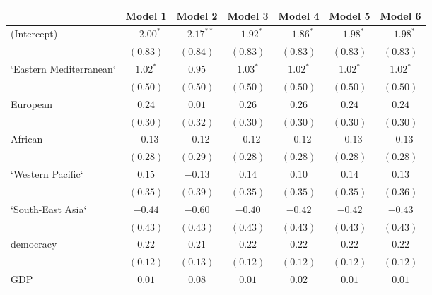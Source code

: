 
\begin{table}[!h]
\begin{center}
\begin{tabular}{l c c c c c c }
\toprule
 & Model 1 & Model 2 & Model 3 & Model 4 & Model 5 & Model 6 \\
\midrule
(Intercept)             & $-2.00^{*}$  & $-2.17^{**}$ & $-1.92^{*}$  & $-1.86^{*}$  & $-1.98^{*}$  & $-1.98^{*}$  \\
                        & $(0.83)$     & $(0.84)$     & $(0.83)$     & $(0.83)$     & $(0.83)$     & $(0.83)$     \\
`Eastern Mediterranean` & $1.02^{*}$   & $0.95$       & $1.03^{*}$   & $1.02^{*}$   & $1.02^{*}$   & $1.02^{*}$   \\
                        & $(0.50)$     & $(0.50)$     & $(0.50)$     & $(0.50)$     & $(0.50)$     & $(0.50)$     \\
European                & $0.24$       & $0.01$       & $0.26$       & $0.26$       & $0.24$       & $0.24$       \\
                        & $(0.30)$     & $(0.32)$     & $(0.30)$     & $(0.30)$     & $(0.30)$     & $(0.30)$     \\
African                 & $-0.13$      & $-0.12$      & $-0.12$      & $-0.12$      & $-0.13$      & $-0.13$      \\
                        & $(0.28)$     & $(0.29)$     & $(0.28)$     & $(0.28)$     & $(0.28)$     & $(0.28)$     \\
`Western Pacific`       & $0.15$       & $-0.13$      & $0.14$       & $0.10$       & $0.14$       & $0.13$       \\
                        & $(0.35)$     & $(0.39)$     & $(0.35)$     & $(0.35)$     & $(0.35)$     & $(0.36)$     \\
`South-East Asia`       & $-0.44$      & $-0.60$      & $-0.40$      & $-0.42$      & $-0.42$      & $-0.43$      \\
                        & $(0.43)$     & $(0.43)$     & $(0.43)$     & $(0.43)$     & $(0.43)$     & $(0.43)$     \\
democracy               & $0.22$       & $0.21$       & $0.22$       & $0.22$       & $0.22$       & $0.22$       \\
                        & $(0.12)$     & $(0.13)$     & $(0.12)$     & $(0.12)$     & $(0.12)$     & $(0.12)$     \\
GDP                     & $0.01$       & $0.08$       & $0.01$       & $0.02$       & $0.01$       & $0.01$       \\

\end{tabular}
\end{center}
\end{table}

